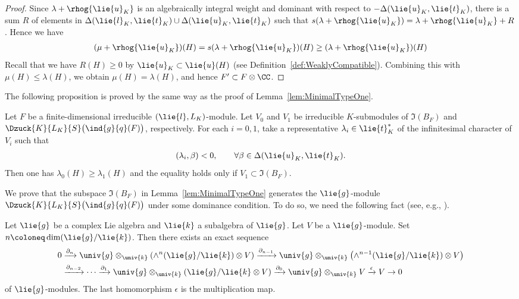 \begin{proof}
	Since $\lambda+\rhog{\lie{u}_K}$ is an algebraically integral weight and dominant with respect to $-\Delta(\lie{u}_K, \lie{t}_K)$,
	there is a sum $R$ of elements in $\Delta(\lie{l}_K, \lie{t}_K)\cup \Delta(\lie{u}_K, \lie{t}_K)$ such that $s(\lambda+\rhog{\lie{u}_K})=\lambda+\rhog{\lie{u}_K} + R$.
	Hence we have
	\begin{align*}
		(\mu + \rhog{\lie{u}_K})(H) = s(\lambda+\rhog{\lie{u}_K})(H) \geq (\lambda+\rhog{\lie{u}_K})(H)
	\end{align*}
	Recall that we have $R(H)\geq 0$ by $\lie{u}_K\subset \lie{u}(H)$ (see Definition~\ref{def:WeaklyCompatible}).
	Combining this with $\mu(H) \leq \lambda(H)$, we obtain $\mu(H)=\lambda(H)$, and hence $F' \subset F\otimes \CC$.
\end{proof}

The following proposition is proved by the same way as the proof of Lemma~\ref{lem:MinimalTypeOne}.

\begin{Proposition}\label{prop:Ktype}
	Let $F$ be a finite-dimensional irreducible $(\lie{l}, L_K)$-module.
	Let $V_0$ and $V_1$ be irreducible $K$-submodules of $\Im(B_F)$ and $\Dzuck{K}{L_K}{S}\bigl(\ind{g}{q}(F)\bigr)$, respectively.
	For each $i = 0, 1$, take a representative $\lambda_i \in \lie{t}^*_K$ of the infinitesimal character of $V_i$ such that
	\begin{align*}
		(\lambda_i, \beta) < 0, \qquad \forall \beta \in \Delta(\lie{u}_K, \lie{t}_K).
	\end{align*}
	Then one has $\lambda_0(H) \geq \lambda_1(H)$ and the equality holds only if $V_1 \subset \Im(B_F)$.
\end{Proposition}

We prove that the subspace $\Im(B_F)$ in Lemma~\ref{lem:MinimalTypeOne} generates the $\lie{g}$-module $\Dzuck{K}{L_K}{S}\bigl(\ind{g}{q}(F)\bigr)$ under some dominance condition.
To do so, we need the following fact (see, e.g., \cite[Lem\-ma~6.A.1.3]{Wa88_real_reductive_I}).

\newcommand{\del}{\partial}

\begin{Fact}\label{fact:KoszulResolution}
	Let $\lie{g}$ be a complex Lie algebra and
	$\lie{k}$ a subalgebra of $\lie{g}$.
	Let $V$ be a $\lie{g}$-module.
	Set $n\coloneq\dim(\lie{g}/\lie{k})$.
	Then there exists an exact sequence
	\begin{align*}
0&\xrightarrow{\del_n} \univ{g}\otimes_{\univ{k}}(\wedge^n (\lie{g}/\lie{k})\otimes V)
		\xrightarrow{\del_{n-1}} \univ{g}\otimes_{\univ{k}}\bigl(\wedge^{n-1} (\lie{g}/\lie{k})\otimes V\bigr)\\
		& \xrightarrow{\del_{n-2}} \cdots \xrightarrow{\del_{1}} \univ{g}\otimes_{\univ{k}}(\lie{g}/\lie{k}\otimes V)
		\xrightarrow{\del_{0}} \univ{g}\otimes_{\univ{k}}V
		\xrightarrow{\epsilon} V \rightarrow 0
	\end{align*}
	of $\lie{g}$-modules.
	The last homomorphism $\epsilon$ is the multiplication map.
\end{Fact}

